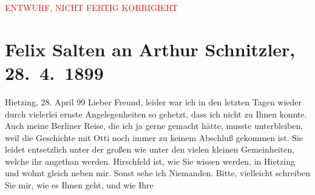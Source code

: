 
\begin{center}
            \textcolor{red}{ENTWURF, NICHT FERTIG KORRIGIERT}
                      \end{center}
            
         
         \renewcommand{\erwaehntePersonen}{Personen: Georg Hirschfeld, Ottilie Salten}
         \renewcommand{\erwaehnteInstitutionen}{Institutionen: Deutsches Theater Berlin}
         \renewcommand{\erwaehnteOrte}{Orte: Berlin, Wien, XIII., Hietzing}
         \renewcommand{\erwaehnteWerke}{Werke: Der grüne Kakadu – Paracelsus – Die Gefährtin. Drei Einakter}
               \section[Felix Salten an Arthur Schnitzler, 28. 4. 1899]{ Felix Salten an Arthur Schnitzler, 28. 4. 1899}\nopagebreak{}\rehead{ }\begin{ledgroupsized}[t]{13cm}\normalsize\beginnumbering \toendnotes[C]{\smallbreak\pagebreak[2]} 
\toendnotes[C]{\smallbreak}\pstart
           \raggedleft{}{\pb}Hietzing, 28. April 99\pend
           \pstart
           Lieber Freund, leider war ich in den letzten Tagen wieder durch
               vielerlei ernste Angelegenheiten so gehetzt, dass ich nicht zu Ihnen konnte. Auch
               meine Berliner Reise, die ich ja gerne gemacht
               hätte, musste unterbleiben, weil die Geschichte mit Otti noch immer zu keinem Abschluß gekommen ist. Sie leidet entsetzlich
               unter der großen wie unter den vielen kleinen Gemeinheiten, welche ihr angethan
               werden. Hirschfeld ist, wie Sie wissen werden,
               in Hietzing und wohnt gleich neben mir. Sonst sehe
               ich Niemanden. Bitte, vielleicht schreiben Sie mir, wie es Ihnen geht, und wie Ihre

\end{ledgroupsized}
